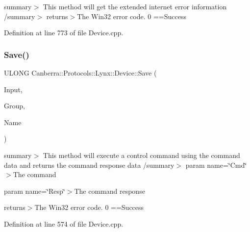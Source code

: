 summary$>$ This method will get the extended internet error information /summary$>$ returns$>$The Win32 error code. 0 ==Success

Definition at line 773 of file Device.\+cpp.

\mbox{\label{class_canberra_1_1_protocols_1_1_lynx_1_1_device_a4f514bd2a06da196fbe8f63cde8d4870_a4f514bd2a06da196fbe8f63cde8d4870}} 
\subsubsection{\texorpdfstring{Save()}{Save()}}
{\footnotesize\ttfamily U\+L\+O\+NG Canberra\+::\+Protocols\+::\+Lynx\+::\+Device\+::\+Save (\begin{DoxyParamCaption}\item[{U\+S\+H\+O\+RT}]{Input,  }\item[{U\+S\+H\+O\+RT}]{Group,  }\item[{\hyperlink{class_canberra_1_1_utility_1_1_core_1_1_string}{Canberra\+::\+Utility\+::\+Core\+::\+String} \&}]{Name }\end{DoxyParamCaption})}

summary$>$ This method will execute a control command using the command data and returns the command response data /summary$>$ param name=\char`\"{}\+Cmd\char`\"{}$>$The command

param name=\char`\"{}\+Resp\char`\"{}$>$The command response

returns$>$The Win32 error code. 0 ==Success

Definition at line 574 of file Device.\+cpp.

\mbox{\label{class_canberra_1_1_protocols_1_1_lynx_1_1_device_ab5f8a362b339768e8f3cde9633be6b87_ab5f8a362b339768e8f3cde9633be6b87}} 
